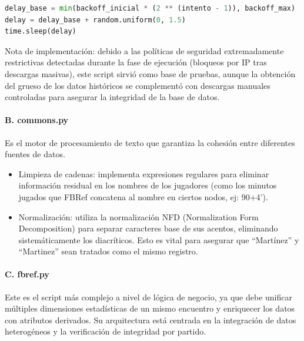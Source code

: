 \begin{lstlisting}[language=Python,caption={Reintento con espera aleatoria para mitigación de detección de bots}]
delay_base = min(backoff_inicial * (2 ** (intento - 1)), backoff_max)
delay = delay_base + random.uniform(0, 1.5)
time.sleep(delay)
\end{lstlisting}

Nota de implementación: debido a las políticas de seguridad extremadamente restrictivas detectadas durante la fase de ejecución (bloqueos por IP tras descargas masivas),
 este script sirvió como base de pruebas, aunque la obtención del grueso de los datos históricos se complementó con descargas manuales controladas para asegurar la integridad
  de la base de datos.

\paragraph{B. commons.py}

Es el motor de procesamiento de texto que garantiza la cohesión entre diferentes fuentes de datos.

\begin{itemize}
\item Limpieza de cadenas: implementa expresiones regulares para eliminar información residual en los nombres de los jugadores (como los minutos jugados que FBRef concatena al nombre en ciertos nodos, ej: 90+4').

\item Normalización: utiliza la normalización NFD (Normalization Form Decomposition) para separar caracteres base de sus acentos, eliminando sistemáticamente los diacríticos. Esto es vital para asegurar que ``Martínez'' y ``Martinez'' sean tratados como el mismo registro.
\end{itemize}

\paragraph{C. fbref.py}

Este es el script más complejo a nivel de lógica de negocio, ya que debe unificar múltiples dimensiones estadísticas de un mismo encuentro y enriquecer 
los datos con atributos derivados. Su arquitectura está centrada en la integración de datos heterogéneos y la verificación de integridad por partido.

